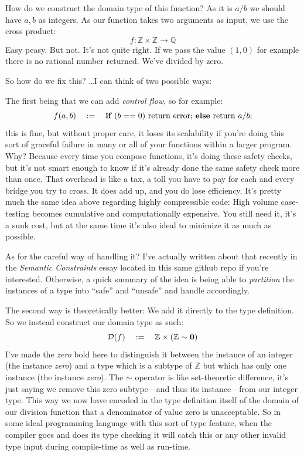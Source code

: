 \documentclass[twoside]{article}
\begin{document}
How do we construct the domain type of this function? As it is $ a/b $ we should have $ a,b $ as integers.
As our function takes two arguments as input, we use the cross product:
$$ f:\mathbb{Z}\times\mathbb{Z}\to\mathbb{Q} $$
Easy peasy. But not. It's not quite right. If we pass the value $ (1,0) $
for example there is no rational number returned. We've divided by zero.

So how do we fix this? \ldots I can think of two possible ways:

The first being that we can add \emph{control flow}, so for example:
$$ f(a, b)\quad :=\quad \mbox{\bfseries if } (b == 0)\mbox{ return error; }\mbox{\bfseries else}\mbox{ return } a/b; $$
this is fine, but without proper care, it loses its scalability if you're doing this sort of graceful failure in
many or all of your functions within a larger program. Why? Because every time you compose functions, it's doing these
safety checks, but it's not smart enough to know if it's already done the same safety check more than once.
That overhead is like a tax, a toll you have to pay for each and every bridge you try to cross.  It does add up,
and you do lose efficiency. It's pretty much the same idea above regarding highly compressible code:
High volume case-testing becomes cumulative and computationally expensive. You still need it, it's a sunk cost,
but at the same time it's also ideal to minimize it as much as possible.

As for the careful way of handling it? I've actually written about that recently in the \emph{Semantic Constraints}
essay located in this same github repo if you're interested. Otherwise, a quick summary of the idea is being able
to \emph{partition} the instances of a type into ``safe'' and ``unsafe'' and handle accordingly.

The second way is theoretically better: We add it directly to the type definition.
So we instead construct our domain type as such:
$$ \mathcal{D}(f) \quad :=\quad \mathbb{Z}\times(\mathbb{Z}\sim\mbox{\bfseries 0}) $$
I've made the \emph{zero} bold here to distinguish it between the instance of an integer (the instance \emph{zero})
and a type which is a subtype of $ \mathbb{Z} $ but which has only one instance (the instance \emph{zero}).
The $ \sim $ operator is like set-theoretic difference, it's just saying we remove this zero subtype---and thus its
instance---from our integer type.  This way we now have encoded in the type definition itself of the domain of our
division function that a denominator of value zero is unacceptable. So in some ideal programming language with this
sort of type feature, when the compiler goes and does its type checking it will catch this or any other invalid type
input during compile-time as well as run-time.
\end{document}
